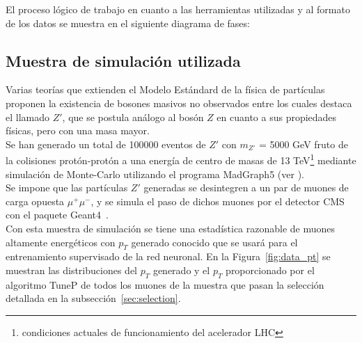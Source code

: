 El proceso l\'ogico de trabajo en cuanto a las herramientas utilizadas y al formato de los datos se muestra en el siguiente diagrama de fases: 

\begin{center}
\end{center}


\subsection{Muestra de simulaci\'on utilizada}\label{sec:sample}

Varias teor\'ias que extienden el Modelo Est\'andard de la f\'isica de part\'iculas proponen la existencia de bosones masivos no observados entre los cuales destaca el llamado $Z'$, que se postula an\'alogo al bos\'on $Z$ en cuanto a sus propiedades f\'isicas, pero con una masa mayor. \\

Se han generado un total de 100000 eventos de $Z'$ con $m_{Z'}$ = 5000 GeV fruto de la colisiones prot\'on-prot\'on a una energ\'ia de centro de masas de 13 TeV\footnote{condiciones actuales de funcionamiento del acelerador LHC} mediante simulaci\'on de Monte-Carlo utilizando el programa MadGraph5 (ver \cite{generator}). \\
Se impone que las part\'iculas $Z'$ generadas se desintegren a un par de muones de carga opuesta $\mu^{+}\mu^{-}$, y se simula el paso de dichos muones por el detector CMS con el paquete Geant4~\cite{Agostinelli:2002hh}. \\

Con esta muestra de simulaci\'on se tiene una estad\'istica razonable de muones altamente energ\'eticos con $p_{T}$ generado conocido que se usar\'a para el entrenamiento supervisado de la red neuronal. En la Figura~\ref{fig:data_pt} se muestran las distribuciones del $p_{T}$ generado y el $p_{T}$ proporcionado por el algoritmo TuneP de todos los muones de la muestra que pasan la selecci\'on detallada en la subsecci\'on~\ref{sec:selection}.

